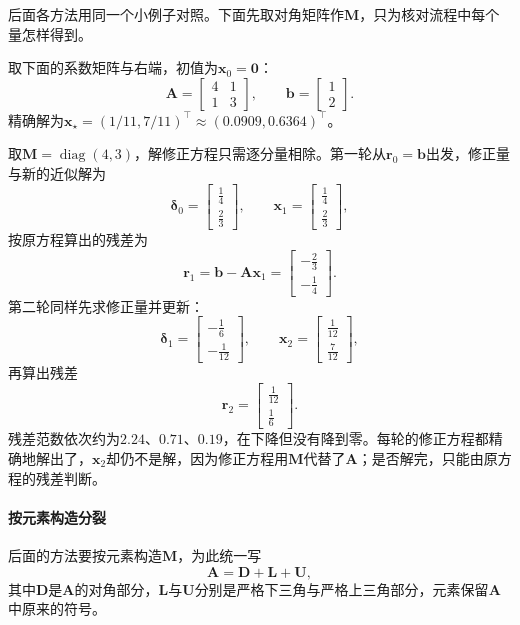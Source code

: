 后面各方法用同一个小例子对照。下面先取对角矩阵作$\bm M$，只为核对流程中每个量怎样得到。
\begin{example}[定常迭代的贯穿例]
\label{ex:ls-stationary-running-example}
取下面的系数矩阵与右端，初值为$\bm x_0=\bm 0$：
\[
\bm A=\begin{bmatrix}4&1\\1&3\end{bmatrix},\qquad
\bm b=\begin{bmatrix}1\\2\end{bmatrix}.
\]
精确解为$\bm x_\star=(1/11,7/11)^\top\approx(0.0909,0.6364)^\top$。

取$\bm M=\operatorname{diag}(4,3)$，解修正方程只需逐分量相除。第一轮从$\bm r_0=\bm b$出发，修正量与新的近似解为
\[
 \bm\delta_0=\begin{bmatrix}\tfrac14\\\tfrac23\end{bmatrix},\qquad
 \bm x_1=\begin{bmatrix}\tfrac14\\\tfrac23\end{bmatrix},
\]
按原方程算出的残差为
\[
 \bm r_1=\bm b-\bm A\bm x_1=\begin{bmatrix}-\tfrac23\\-\tfrac14\end{bmatrix}.
\]
第二轮同样先求修正量并更新：
\[
 \bm\delta_1=\begin{bmatrix}-\tfrac16\\-\tfrac1{12}\end{bmatrix},\qquad
 \bm x_2=\begin{bmatrix}\tfrac1{12}\\\tfrac7{12}\end{bmatrix},
\]
再算出残差
\[
 \bm r_2=\begin{bmatrix}\tfrac1{12}\\\tfrac16\end{bmatrix}.
\]
残差范数依次约为$2.24$、$0.71$、$0.19$，在下降但没有降到零。每轮的修正方程都精确地解出了，$\bm x_2$却仍不是解，因为修正方程用$\bm M$代替了$\bm A$；是否解完，只能由原方程的残差判断。
\end{example}

\paragraph{按元素构造分裂}
后面的方法要按元素构造$\bm M$，为此统一写
\begin{equation}
\bm A=\bm D+\bm L+\bm U ,
 \label{eq:ls-stationary-dlu-splitting}
\end{equation}
其中$\bm D$是$\bm A$的对角部分，$\bm L$与$\bm U$分别是严格下三角与严格上三角部分，元素保留$\bm A$中原来的符号。

